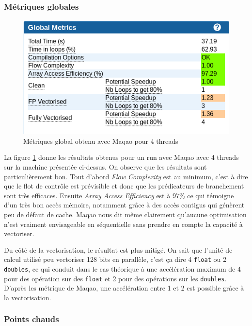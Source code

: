 \documentclass[11pt,a4paper]{article}
\begin{document}
		\subsubsection{Métriques globales}

			\begin{figure}[h!]
				\centering
				\begin{center}
					\includegraphics{images/maqao_global_metrics.png}
					\caption{Métriques global obtenu avec Maqao pour 4 threads}
					\label{global_maqao}
				\end{center}
			\end{figure}

			La figure \ref{global_maqao} donne les résultats obtenus pour un run avec Maqao avec 4 threads sur la machine présentée ci-dessus. On observe que les résultats sont particulièrement bon. Tout d'abord \textit{Flow Complexity} est au minimum, c'est à dire que le flot de contrôle est prévisible et donc que les prédicateurs de branchement sont très efficaces. Ensuite \textit{Array Access Efficiency} est à 97\% ce qui témoigne d'un très bon accès mémoire, notamment grâce à des accès contigus qui génèrent peu de défaut de cache. Maqao nous dit même clairement qu'aucune optimisation n'est vraiment envisageable en séquentielle sans prendre en compte la capacité à vectoriser.

			Du côté de la vectorisation, le résultat est plus mitigé. On sait que l'unité de calcul utilisé peu vectoriser 128 bits en parallèle, c'est ça dire 4 \texttt{float} ou 2 \texttt{doubles}, ce qui conduit dans le cas théorique à une accélération maximum de 4 pour des opération sur des \texttt{float} et 2 pour des opérations sur les \texttt{doubles}. D'après les métrique de Maqao, une accélération entre 1 et 2 est possible grâce à la vectorisation.

		\subsubsection{Points chauds}
\end{document}
